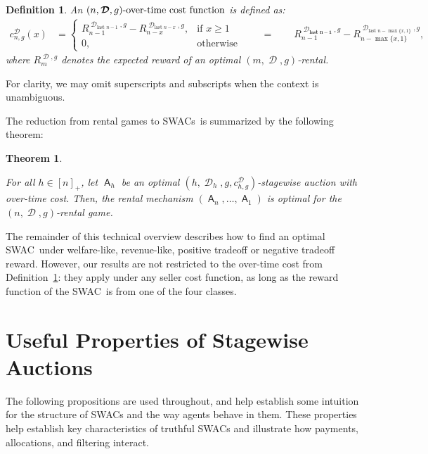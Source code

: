 \documentclass[11pt,letterpaper]{article}
\newcommand{\brackets}[1]{\left( #1 \right)}
\newcommand{\swac}{SWAC\xspace}
\newcommand{\swacs}{SWACs\xspace}
\newcommand{\psqrrange}[1]{[#1]_+}
\DeclareMathOperator{\A}{\auc{A}}
\DeclareMathOperator{\D}{\mathcal{D}}
\newcommand{\g}{g}
\theoremstyle{plain}
\newtheorem{theorem}{Theorem}[section]
\newtheorem{definition}{Definition}
\newcommand{\auc}[1]{\mathsf{#1}}
\begin{document}
\begin{definition}
An $(n,\boldsymbol{\D},\g)\textnormal{-over-time cost function}$ is defined as:
\begin{align*}
    c^{\boldsymbol{\D}}_{n,\g}(x)
    &=
    \begin{cases}
        R^{\boldsymbol{\D}_{\text{last }n-1},\g}_{n-1}-R^{\boldsymbol{\D}_{\text{last }n-x},\g}_{n-x},&\text{if }x\geq 1\\
        0,&\text{otherwise}
    \end{cases} %
    \qquad
    =
    \qquad
    R^{\boldsymbol{\D_{\text{last }n-1}},\g}_{n-1}-R^{\boldsymbol{\D}_{\text{last }n-\max\{x,1\}},\g}_{n-\max\{x,1\}},
\end{align*}
where $R^{\boldsymbol{\D},\g}_m$ denotes the expected reward of an optimal $(m,\boldsymbol{\D},\g)$-rental.
\label{def:cost-function}
\end{definition}
For clarity, we may omit superscripts and subscripts when the context is unambiguous.

The reduction from rental games to \swacs\ is summarized by the following theorem:

\begin{theorem}\label{theorem:rental_as_auctions}

    For all $h\in\psqrrange{n}$, let $\A_h$ be an optimal $\brackets{h,\D_h,\g,c_{h,\g}^{\boldsymbol{\D}}}$-stagewise auction with over-time cost. Then, the rental mechanism $\brackets{\A_n,\dots,\A_1}$ is optimal for the $(n,\boldsymbol{\D},\g)$-rental game.

\end{theorem}


The remainder of this technical overview describes how to find an optimal \swac\ under welfare-like, revenue-like, positive tradeoff or negative tradeoff reward.
However, our results are not restricted to the over-time cost from Definition~\ref{def:cost-function}:
they apply under any seller cost function, as long as the reward function
of the \swac\ is from one of the four classes.

\section{Useful Properties of Stagewise Auctions}\label{sec:properties}

The following propositions are used throughout,
and help establish some intuition for the structure of \swacs
and the way agents behave in them. These properties help establish key characteristics of truthful \swacs and illustrate how payments, allocations, and filtering interact.
\end{document}
